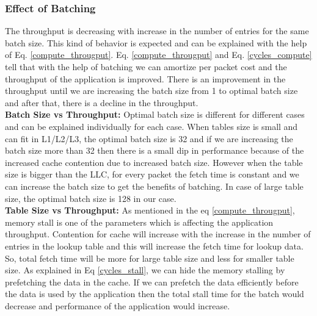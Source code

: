 \subsubsection{Effect of Batching}
\label{batchingsubsection}
The throughput is decreasing with increase in the number of entries for the same batch size. This kind of behavior is expected and can be explained with the help of Eq. \ref{compute_througput}. Eq. \ref{compute_througput} and Eq. \ref{cycles_compute} tell that with the help of batching we can amortize per packet cost and the throughput of the application is improved. There is an improvement in the throughput until we are increasing the batch size from 1 to optimal batch size and after that, there is a decline in the throughput.
\\
\textbf{Batch Size vs Throughput:} Optimal batch size is different for different cases and can be explained individually for each case. When tables size is small and can fit in L1/L2/L3, the optimal batch size is 32 and if we are increasing the batch size more than 32 then there is a small dip in performance because of the increased cache contention due to increased batch size. However when the table size is bigger than the LLC, for every packet the fetch time is constant and we can increase the batch size to get the benefits of batching. In case of large table size, the optimal batch size is 128 in our case.
\\
\textbf{Table Size vs Throughput:} As mentioned in the eq \ref{compute_througput}, memory stall is one of the parameters which is affecting the application throughput. Contention for cache will increase with the increase in the number of entries in the lookup table and this will increase the fetch time for lookup data. So, total fetch time will be more for large table size and less for smaller table size. As explained in Eq \ref{cycles_stall}, we can hide the memory stalling by prefetching the data in the cache. If we can prefetch the data efficiently before the data is used by the application then the total stall time for the batch would decrease and performance of the application would increase.

